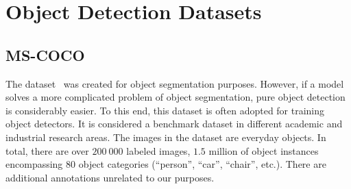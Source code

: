 \section{Object Detection Datasets}
\label{sec:ObjectDetectionDatasets}

\subsection{MS-COCO}
\label{ssec:DatasetMSCOCO}

The \mscoco{} dataset~\cite{lin2014mscoco} was created for object segmentation purposes. However, if a model solves a more complicated problem of object segmentation, pure object detection is considerably easier. To this end, this dataset is often adopted for training object detectors. It is considered a benchmark dataset in different academic and industrial research areas. The images in the dataset are everyday objects. In total, there are over $200\ 000$ labeled images, $1.5$ million of object instances encompassing $80$ object categories (``person'', ``car'', ``chair'', etc.). There are additional annotations unrelated to our purposes.
